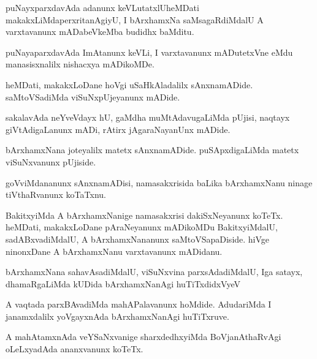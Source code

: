 \documentclass{article}
\begin{document}
\begin{mn}
puNayxparxdavAda adanunx keVLutatxlUheMDati makakxLiMdaperxritanAgiyU, 
I bArxhamxNa saMsagaRdiMdalU A varxtavanunx mADabeVkeMba budidhx baMditu.
\end{mn}

\begin{mn}
puNayaparxdavAda ImAtanunx  keVLi, I varxtavanunx mADutetxVne  eMdu manasisxnalilx  nishacxya mADikoMDe. 
\end{mn}

\begin{mn}
heMDati, makakxLoDane hoVgi uSaHkAladalilx  sAnxnamADide. saMtoVSadiMda viSuNxpUjeyanunx  mADide.
\end{mn}

\begin{mn}
sakalavAda neYveVdayx  hU, gaMdha muMtAdavugaLiMda  pUjisi, naqtayx giVtAdigaLanunx  
mADi,  rAtirx jAgaraNayanUnx mADide.
\end{mn}

\begin{mn}
bArxhamxNana joteyalilx  matetx  sAnxnamADide.  puSApxdigaLiMda matetx viSuNxvanunx pUjiside. 
\end{mn}

\begin{mn}
goVviMdananunx  sAnxnamADisi, namasakxrisida baLika bArxhamxNanu ninage tiVthaRvanunx koTaTxnu.
\end{mn}

\begin{mn}
BakitxyiMda A  bArxhamxNanige namasakxrisi  dakiSxNeyanunx koTeTx. heMDati, 
makakxLoDane pAraNeyanunx mADikoMDu BakitxyiMdalU,  sadABxvadiMdalU, 
A bArxhamxNananunx  saMtoVSapaDiside.  hiVge ninonxDane A bArxhamxNanu varxtavanunx mADidanu.
\end{mn}

\begin{mn}
bArxhamxNana sahavAsadiMdalU, viSuNxvina parxsAdadiMdalU, Iga satayx, 
dhamaRgaLiMda kUDida bArxhamxNanAgi huTiTxdidxVyeV
\end{mn}

\begin{mn}
A vaqtada parxBAvadiMda mahAPalavanunx hoMdide.  AdudariMda I janamxdalilx 
yoVgayxnAda bArxhamxNanAgi huTiTxruve.
\end{mn}

\begin{mn}
A mahAtamxnAda veYSaNxvanige sharxdedhxyiMda  BoVjanAthaRvAgi oLeLxyadAda ananxvanunx koTeTx.
\end{mn}
\end{document}
